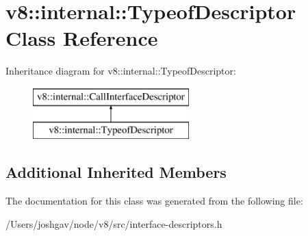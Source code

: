 \hypertarget{classv8_1_1internal_1_1_typeof_descriptor}{}\section{v8\+:\+:internal\+:\+:Typeof\+Descriptor Class Reference}
\label{classv8_1_1internal_1_1_typeof_descriptor}
Inheritance diagram for v8\+:\+:internal\+:\+:Typeof\+Descriptor\+:\begin{figure}[H]
\begin{center}
\leavevmode
\includegraphics[height=2.000000cm]{classv8_1_1internal_1_1_typeof_descriptor}
\end{center}
\end{figure}
\subsection*{Additional Inherited Members}


The documentation for this class was generated from the following file\+:\begin{DoxyCompactItemize}
\item 
/\+Users/joshgav/node/v8/src/interface-\/descriptors.\+h\end{DoxyCompactItemize}
